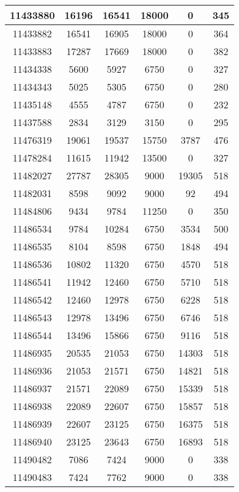 \begin{appendices}
\begin{center}
\begin{longtable}{|c|c|c|c|c|c|}
11433880 & 16196 & 16541 & 18000 & 0     & 345 \\ \hline
11433882 & 16541 & 16905 & 18000 & 0     & 364 \\ \hline
11433883 & 17287 & 17669 & 18000 & 0     & 382 \\ \hline
11434338 & 5600  & 5927  & 6750  & 0     & 327 \\ \hline
11434343 & 5025  & 5305  & 6750  & 0     & 280 \\ \hline
11435148 & 4555  & 4787  & 6750  & 0     & 232 \\ \hline
11437588 & 2834  & 3129  & 3150  & 0     & 295 \\ \hline
11476319 & 19061 & 19537 & 15750 & 3787  & 476 \\ \hline
11478284 & 11615 & 11942 & 13500 & 0     & 327 \\ \hline
11482027 & 27787 & 28305 & 9000  & 19305 & 518 \\ \hline
11482031 & 8598  & 9092  & 9000  & 92    & 494 \\ \hline
11484806 & 9434  & 9784  & 11250 & 0     & 350 \\ \hline
11486534 & 9784  & 10284 & 6750  & 3534  & 500 \\ \hline
11486535 & 8104  & 8598  & 6750  & 1848  & 494 \\ \hline
11486536 & 10802 & 11320 & 6750  & 4570  & 518 \\ \hline
11486541 & 11942 & 12460 & 6750  & 5710  & 518 \\ \hline
11486542 & 12460 & 12978 & 6750  & 6228  & 518 \\ \hline
11486543 & 12978 & 13496 & 6750  & 6746  & 518 \\ \hline
11486544 & 13496 & 15866 & 6750  & 9116  & 518 \\ \hline
11486935 & 20535 & 21053 & 6750  & 14303 & 518 \\ \hline
11486936 & 21053 & 21571 & 6750  & 14821 & 518 \\ \hline
11486937 & 21571 & 22089 & 6750  & 15339 & 518 \\ \hline
11486938 & 22089 & 22607 & 6750  & 15857 & 518 \\ \hline
11486939 & 22607 & 23125 & 6750  & 16375 & 518 \\ \hline
11486940 & 23125 & 23643 & 6750  & 16893 & 518 \\ \hline
11490482 & 7086  & 7424  & 9000  & 0     & 338 \\ \hline
11490483 & 7424  & 7762  & 9000  & 0     & 338 \\ \hline

\end{longtable}
\end{center}
\end{appendices}
